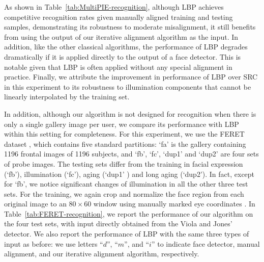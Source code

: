 \documentclass[10pt,journal,letterpaper,compsoc]{IEEEtran}
\begin{document}
As shown in Table~\ref{tab:MultiPIE-recognition}, although LBP
achieves competitive recognition rates given manually aligned
training and testing samples, demonstrating its robustness to
moderate misalignment, it still benefits from using the output
of our iterative alignment algorithm as the input. In addition,
like the other classical algorithms, the performance of LBP
degrades dramatically if it is applied directly to the output
of a face detector. This is notable given that LBP is often
applied without any special alignment in practice. Finally, we
attribute the improvement in performance of LBP over SRC in
this experiment to its robustness to illumination components
that cannot be linearly interpolated by the training set.

In addition, although our algorithm is not designed for
recognition when there is only a single gallery image per user,
we compare its performance with LBP within this setting for
completeness. For this experiment, we use the FERET dataset
\cite{phillips1998feret}, which contains five standard
partitions: `fa' is the gallery containing 1196 frontal images
of 1196 subjects, and `fb', `fc', `dup1' and `dup2' are four
sets of probe images. The testing sets differ from the training
in facial expression (`fb'), illumination (`fc'), aging (`dup1'
) and long aging (`dup2'). In fact, except for `fb', we notice
significant changes of illumination in all the other three test
sets. For the training, we again crop and normalize the face
region from each original image to an $80\times 60$ window
using manually marked eye coordinates \cite{Deng2010-PR}. In
Table~\ref{tab:FERET-recognition}, we report the performance of
our algorithm on the four test sets, with input directly
obtained from the Viola and Jones' detector. We also report the
performance of LBP with the same three types of input as before:
we use letters
``$d$'', ``$m$'', and ``$i$'' to indicate face detector, manual
alignment, and our iterative alignment algorithm, respectively.
\end{document}
